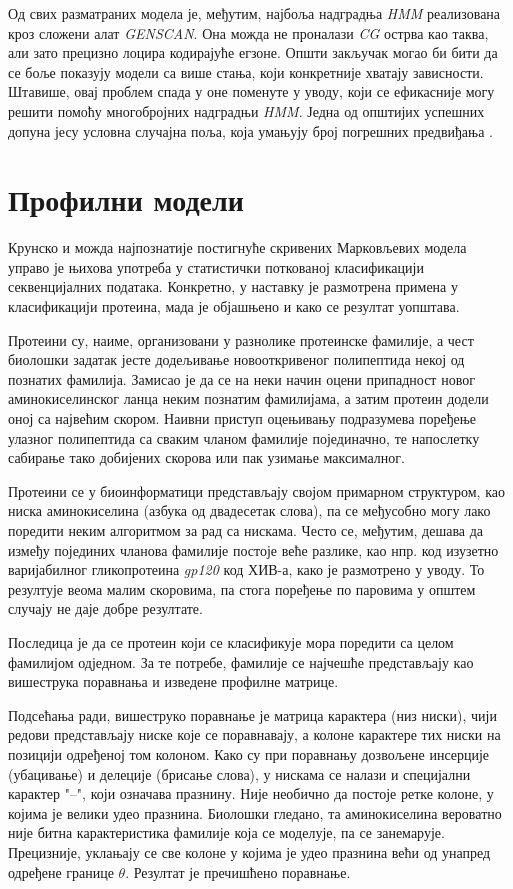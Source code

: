 \documentclass[12pt,oneside]{memoir}
\begin{document}
\begin{CJK}{UTF8}{ipxm}
Од свих разматраних модела је, међутим, најбоља надградња \textit{HMM} реализована кроз сложени алат \textit{GENSCAN}. Она можда не проналази \textit{CG} острва као таква, али зато прецизно лоцира кодирајуће егзоне. Општи закључак могао би бити да се боље показују модели са више стања, који конкретније хватају зависности. Штавише, овај проблем спада у оне поменуте у уводу, који се ефикасније могу решити помоћу многобројних надградњи \textit{HMM}. Једна од општијих успешних допуна јесу условна случајна поља, која умањују број погрешних предвиђања \cite{culotta2005, decaprio2007}.

\section{Профилни модели}
Крунско и можда најпознатије постигнуће скривених Марковљевих модела управо је њихова употреба у статистички поткованој класификацији секвенцијалних података. Конкретно, у наставку је размотрена примена у класификацији протеина, мада је објашњено и како се резултат уопштава.

Протеини су, наиме, организовани у разнолике протеинске фамилије, а чест биолошки задатак јесте додељивање новооткривеног полипептида некој од познатих фамилија. Замисао је да се на неки начин оцени припадност новог аминокиселинског ланца неким познатим фамилијама, а затим протеин додели оној са највећим скором. Наивни приступ оцењивању подразумева поређење улазног полипептида са сваким чланом фамилије појединачно, те напослетку сабирање тако добијених скорова или пак узимање максималног.

Протеини се у биоинформатици представљају својом примарном структуром, као ниска аминокиселина (азбука од двадесетак слова), па се међусобно могу лако поредити неким алгоритмом за рад са нискама. Често се, међутим, дешава да између појединих чланова фамилије постоје веће разлике, као нпр. код изузетно варијабилног гликопротеина \textit{gp120} код ХИВ-а, како је размотрено у уводу. То резултује веома малим скоровима, па стога поређење по паровима у општем случају не даје добре резултате.

Последица је да се протеин који се класификује мора поредити са целом фамилијом одједном. За те потребе, фамилије се најчешће представљају као вишеструка поравнања и изведене профилне матрице.

Подсећања ради, вишеструко поравнање је матрица карактера (низ ниски), чији редови представљају ниске које се поравнавају, а колоне карактере тих ниски на позицији одређеној том колоном. Како су при поравнању дозвољене инсерције (убацивање) и делеције (брисање слова), у нискама се налази и специјални карактер "--", који означава празнину. Није необично да постоје ретке колоне, у којима је велики удео празнина. Биолошки гледано, та аминокиселина вероватно није битна карактеристика фамилије која се моделује, па се занемарује. Прецизније, уклањају се све колоне у којима је удео празнина већи од унапред одређене границе $\theta$. Резултат је пречишћено поравнање.


\end{CJK}
\end{document}
